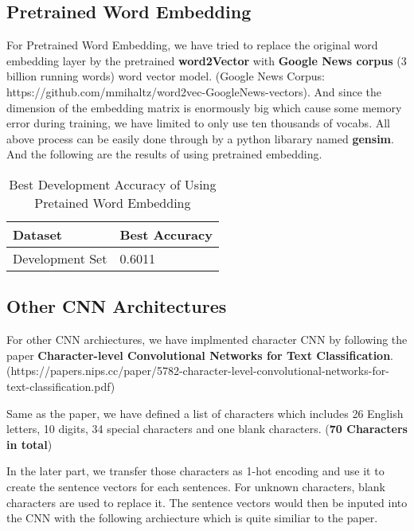 \documentclass{article}
\begin{document}
\subsection{Pretrained Word Embedding}
For Pretrained Word Embedding, we have tried to replace the original word embedding layer by the pretrained \textbf{word2Vector} with \textbf{Google News corpus} (3 billion running words) word vector model. (Google News Corpus: https://github.com/mmihaltz/word2vec-GoogleNews-vectors). And since the dimension of the embedding matrix is enormously big which cause some memory error during training, we have limited to only use ten thousands of vocabs. All above process can be easily done through by a python libarary named \textbf{gensim}. And the following are the results of using pretrained embedding.

\begin{table}[htb]
	\caption{Best Development Accuracy of Using Pretained Word Embedding}
	\label{sample-table}
	\centering
	\begin{tabular}{ll}
		\toprule
		\cmidrule{1-2}
		Dataset & Best Accuracy\\
		\midrule
		Development Set & 0.6011  \\
		\bottomrule
	\end{tabular}
\end{table}

\pagebreak

\subsection{Other CNN Architectures}
For other CNN archiectures, we have implmented character CNN by following the paper \textbf{Character-level Convolutional Networks for Text Classification}. (https://papers.nips.cc/paper/5782-character-level-convolutional-networks-for-text-classification.pdf) 

Same as the paper, we have defined a list of characters which includes 26 English letters, 10 digits, 34 special characters and one blank characters. (\textbf{70 Characters in total})

In the later part, we transfer those characters as 1-hot encoding and use it to create the sentence vectors for each sentences. For unknown characters, blank characters are used to replace it. The sentence vectors would then be inputed into the CNN with the following archiecture which is quite similiar to the paper.
\end{document}
